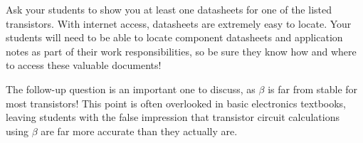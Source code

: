 
Ask your students to show you at least one datasheets for one of the listed transistors.  With internet access, datasheets are extremely easy to locate.  Your students will need to be able to locate component datasheets and application notes as part of their work responsibilities, so be sure they know how and where to access these valuable documents!

The follow-up question is an important one to discuss, as $\beta$ is far from stable for most transistors!  This point is often overlooked in basic electronics textbooks, leaving students with the false impression that transistor circuit calculations using $\beta$ are far more accurate than they actually are.




